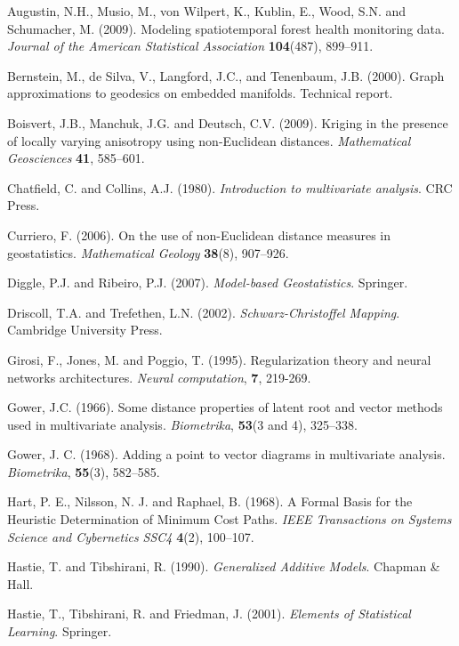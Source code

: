 \documentclass[useAMS, referee]{biom}
\begin{document}
\begin{thebibliography}{99}

\bibitem{} Augustin, N.H., Musio, M., von Wilpert, K., Kublin, E., Wood, S.N. and Schumacher, M. (2009). 
Modeling spatiotemporal forest health monitoring data. \textit{Journal of the American Statistical Association} \textbf{104}(487), 899--911.

\bibitem{} Bernstein, M., de Silva, V., Langford, J.C., and Tenenbaum, J.B. (2000). Graph approximations to geodesics on embedded manifolds. Technical report.

\bibitem{} Boisvert, J.B., Manchuk,  J.G. and Deutsch, C.V. (2009). Kriging in the presence of locally varying anisotropy using non-{E}uclidean distances. \textit{Mathematical Geosciences} \textbf{41}, 585--601.

\bibitem{} Chatfield, C. and Collins, A.J. (1980). \textit{Introduction to multivariate analysis}. CRC Press.

\bibitem{} Curriero, F. (2006). On the use of non-{E}uclidean distance measures in geostatistics. \textit{Mathematical Geology} \textbf{38}(8), 907--926.

\bibitem{} Diggle, P.J. and Ribeiro, P.J. (2007). \textit{Model-based Geostatistics}. Springer.

\bibitem{} 	Driscoll, T.A. and Trefethen, L.N. (2002). \textit{Schwarz-Christoffel Mapping}. Cambridge University Press.

\bibitem{} Girosi, F., Jones, M. and Poggio, T. (1995). Regularization theory and neural networks architectures. \textit{Neural computation}, \textbf{7}, 219-269.

\bibitem{} Gower, J.C. (1966). Some distance properties of latent root and vector methods used in multivariate analysis. \textit{Biometrika}, \textbf{53}(3 and 4), 325--338.

\bibitem{} Gower, J. C. (1968). Adding a point to vector diagrams in multivariate analysis. \textit{Biometrika}, \textbf{55}(3), 582--585.

\bibitem{} Hart, P. E., Nilsson, N. J. and Raphael, B. (1968). A Formal Basis for the Heuristic Determination of Minimum Cost Paths. \textit{IEEE Transactions on Systems Science and Cybernetics SSC4} \textbf{4}(2), 100--107.

\bibitem{} Hastie, T. and Tibshirani, R. (1990). \textit{Generalized Additive Models}. Chapman \& Hall.

\bibitem{} Hastie, T., Tibshirani, R. and Friedman, J. (2001). \textit{Elements of Statistical Learning}. Springer.


\end{thebibliography}
\end{document}
